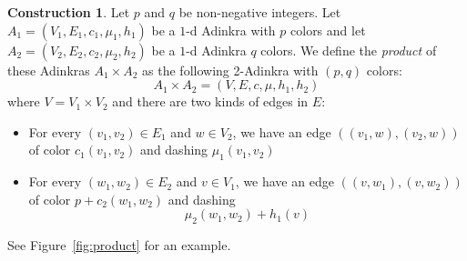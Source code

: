 \documentclass[12pt,twoside,singlespace]{article}
\numberwithin{equation}{section}
\theoremstyle{definition}
\newtheorem{construction}[equation]{Construction}
\begin{document}
\begin{construction}
\label{const:product}
Let $p$ and $q$ be non-negative integers.  Let $A_1=(V_1, E_1, c_1, \mu_1,h_1)$ be a $1$-d Adinkra with $p$ colors and let $A_2=(V_2, E_2, c_2, \mu_2,h_2)$ be a $1$-d Adinkra $q$ colors.  We define the \emph{product} of these Adinkras $A_1\times A_2$ as the following 2-Adinkra with $(p,q)$ colors:
\[A_1\times A_2=(V,E,c,\mu,h_1,h_2)\]
where $V=V_1\times V_2$ and there are two kinds of edges in $E$:
\begin{itemize}
\item For every $(v_1,v_2)\in E_1$ and $w\in V_2$, we have an edge $((v_1,w),(v_2,w))$ of color $c_1(v_1,v_2)$ and dashing $\mu_1(v_1,v_2)$
\item For every $(w_1,w_2)\in E_2$ and $v\in V_1$, we have an edge $((v,w_1),(v,w_2))$ of color $p+c_2(w_1,w_2)$ and dashing
\begin{equation}
\label{eqn:dashprodshift}
\mu_2(w_1,w_2)+h_1(v)
\end{equation}
\end{itemize}
 See Figure~\ref{fig:product} for an example.
\end{construction}
\end{document}
